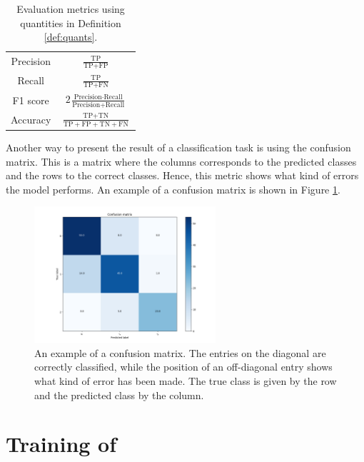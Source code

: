 \begin{table}
 \centering
 \caption{Evaluation metrics using quantities in Definition \ref{def:quants}.}
 \label{tab:eval-metrics}
 {\tabulinesep=1.2mm
 \begin{tabu}{c|c}
   Precision  & $\frac{\text{TP}}{\text{TP} + \text{FP}}$ \\ \hdashline
   Recall     & $\frac{\text{TP}}{\text{TP} + \text{FN}}$ \\ \hdashline
   F1 score   & $2 \frac{\text{Precision} \cdot \text{Recall}}{\text{Precision} + \text{Recall}}$ \\ \hdashline
   Accuracy   & $\frac{\text{TP} + \text{TN}}{\text{TP} + \text{FP} + \text{TN} + \text{FN}}$
 \end{tabu}}
\end{table}

Another way to present the result of a classification task is using the confusion matrix. This is a matrix where the columns corresponds to the predicted classes and the rows to the correct classes. Hence, this metric shows what kind of errors the model performs. An example of a confusion matrix is shown in Figure \ref{fig:conf-example}.

\begin{figure}
  \centering
  \includegraphics[width=0.6\textwidth]{files/figs/backg/conf-example.png}
  \caption{An example of a confusion matrix. The entries on the diagonal are correctly classified, while the position of an off-diagonal entry shows what kind of error has been made. The true class is given by the row and the predicted class by the column.}
  \label{fig:conf-example}
\end{figure}


\section{Training of }

